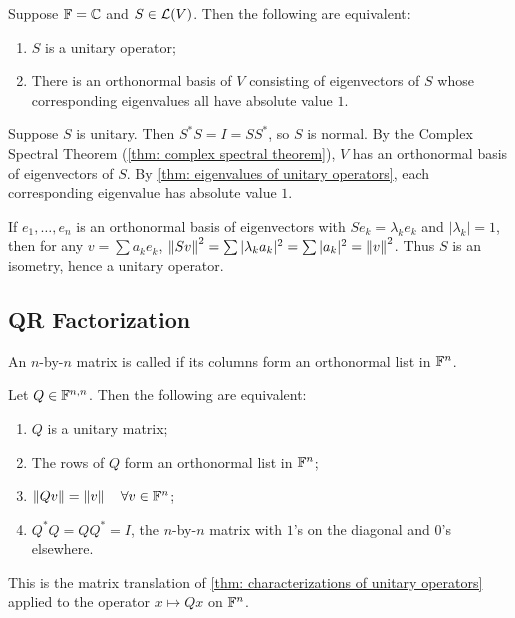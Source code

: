 \begin{thm}
  \label{thm: description of unitary operators on complex inner product spaces}
  Suppose $\mathbb{F} = \mathbb{C}$ and $S \in \mathcal{L}(V)$. Then the following are equivalent:
  \begin{enumerate}[label=\textbf{(\alph*)}]
    \item $S$ is a unitary operator;
    \item There is an orthonormal basis of $V$ consisting of eigenvectors of $S$ whose corresponding eigenvalues all have absolute value $1$.
  \end{enumerate}
\end{thm}
\begin{prf}
  \Rightarrowdirection Suppose $S$ is unitary. Then $S^*S = I = SS^*$, so $S$ is normal. By the Complex Spectral Theorem (\ref{thm: complex spectral theorem}), $V$ has an orthonormal basis of eigenvectors of $S$. By \ref{thm: eigenvalues of unitary operators}, each corresponding eigenvalue has absolute value $1$.

  \Leftarrowdirection If $e_1, \dots, e_n$ is an orthonormal basis of eigenvectors with $Se_k = \lambda_k e_k$ and $|\lambda_k| = 1$, then for any $v = \sum a_k e_k$, $\left \lVert Sv \right \rVert^2 = \sum |\lambda_k a_k|^2 = \sum |a_k|^2 = \left \lVert v \right \rVert^2$. Thus $S$ is an isometry, hence a unitary operator.
\end{prf}

\subsection{QR Factorization}
\begin{mydef}
  An $n$-by-$n$ matrix is called  if its columns form an orthonormal list in $\mathbb{F}^n$.
\end{mydef}

\begin{thm}
  Let $Q \in \mathbb{F}^{n,n}$. Then the following are equivalent:
  \begin{enumerate}[label=\textbf{(\alph*)}]
    \item $Q$ is a unitary matrix;
    \item The rows of $Q$ form an orthonormal list in $\mathbb{F}^{n}$;
    \item $\left \lVert Qv \right \rVert = \left \lVert v \right \rVert \quad \forall v \in \mathbb{F}^n$;
    \item $Q^*Q=QQ^*=I$, the $n$-by-$n$ matrix with $1$'s on the diagonal and $0$'s elsewhere.
  \end{enumerate}
\end{thm}
\begin{prf}
  This is the matrix translation of \ref{thm: characterizations of unitary operators} applied to the operator $x \mapsto Qx$ on $\mathbb{F}^n$.
\end{prf}


